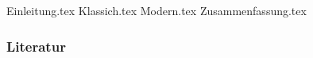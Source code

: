 \documentclass[aspectratio=\BeamerAspectRatio]{beamer}
\begin{document}
\maketitlepage %
\makesectionpopup %

{Einleitung.tex}
{Klassich.tex}
{Modern.tex}
{Zusammenfassung.tex}

\begin{frame}[allowframebreaks]
    \frametitle{Literatur}
    \printbibliography
\end{frame}
\end{document}
